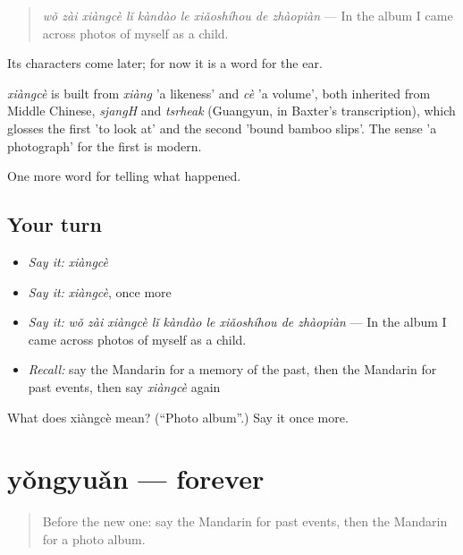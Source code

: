 \begin{quote}
\emph{wǒ zài xiàngcè lǐ kàndào le xiǎoshíhou de zhàopiàn} — In the album I came across photos of myself as a child.
\end{quote}

Its characters come later; for now it is a word for the ear.

\begin{cousinweb}
\emph{xiàngcè} is built from \emph{xiàng} 'a likeness' and \emph{cè} 'a volume', both inherited from Middle Chinese, \emph{sjangH} and \emph{tsrheak} (Guangyun, in Baxter's transcription), which glosses the first 'to look at' and the second 'bound bamboo slips'. The sense 'a photograph' for the first is modern.
\end{cousinweb}

\begin{grammarlens}[title={What you've built}]
One more word for telling what happened.
\end{grammarlens}

\subsection*{Your turn}
\begin{itemize}
\raggedright
  \item \emph{Say it:} \emph{xiàngcè}
  \item \emph{Say it:} \emph{xiàngcè}, once more
  \item \emph{Say it:} \emph{wǒ zài xiàngcè lǐ kàndào le xiǎoshíhou de zhàopiàn} — In the album I came across photos of myself as a child.
  \item \emph{Recall:} say the Mandarin for a memory of the past, then the Mandarin for past events, then say \emph{xiàngcè} again
\end{itemize}

\begin{tcolorbox}[breakable,colback=teal!4,colframe=teal!35!black,title={Before you move on}]
What does xiàngcè mean? (\textquotedblleft{}Photo album\textquotedblright{}.) Say it once more.
\end{tcolorbox}
\section[yǒngyuǎn]{yǒngyuǎn — forever}

\label{lesson:ZH-C344-yongyuan}



\begin{quote}
Before the new one: say the Mandarin for past events, then the Mandarin for a photo album.
\end{quote}

